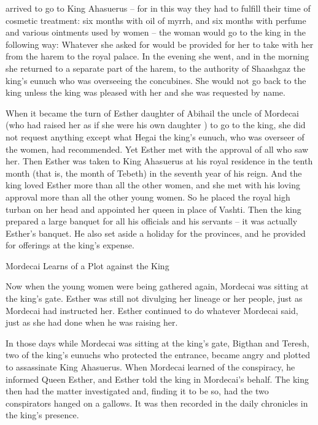 {arrived
to go to
King
Ahasuerus
– for
in this way
they had to fulfill
their time
of cosmetic treatment: six
months
with oil
of myrrh,
and six
months
with perfume
and various ointments
used by women –
the woman
would go
to
the king
in the following way: Whatever
she asked
for would be provided
for her to take
with
her from
the harem
to
the royal
palace.
In the evening
she
went,
and in the morning
she
returned
to
a separate part of the harem,
to the authority of Shaashgaz
the king’s
eunuch
who
was overseeing
the concubines.
She would not
go
back
to
the king
unless
the king
was pleased
with her and she was requested
by name.
\par }{\PP {}When it
became the turn
of Esther
daughter
of Abihail
the uncle
of Mordecai
(who had
raised her
as if
she were his own daughter
) to go
to
the king,
she did not
request
anything
except what
Hegai
the king’s
eunuch,
who was
overseer
of the women,
had recommended. Yet Esther
met
with the approval
of all
who saw her.
Then Esther
was taken
to
King
Ahasuerus
at his royal
residence
in the tenth
month
(that is,
the month
of Tebeth) in the seventh
year
of his reign.
And the king
loved
Esther
more than all
the other women,
and she met
with his loving approval
more than all
the other young women.
So he placed
the royal
high turban
on her head
and appointed her queen
in place
of Vashti.
Then the king
prepared
a large
banquet
for all
his officials
and his servants
– it was actually Esther’s
banquet.
He also set aside
a holiday
for the provinces,
and he provided
for offerings
at the king’s
expense.
\par }{\SH Mordecai Learns of a Plot against the King
\par }{\PP {}Now when the young women
were being gathered
again,
Mordecai
was sitting
at the king’s
gate.
Esther
was still not
divulging
her lineage
or her people,
just as
Mordecai
had instructed
her. Esther
continued to do
whatever Mordecai
said,
just as
she had done when
he was raising her.
\par }{\PP {}In those
days
while
Mordecai
was
sitting
at
the king’s
gate,
Bigthan
and Teresh,
two
of the king’s
eunuchs
who protected
the entrance,
became angry
and plotted to assassinate
King
Ahasuerus.
When Mordecai
learned
of the conspiracy,
he informed
Queen
Esther,
and Esther
told
the king
in Mordecai’s
behalf.
The
king then had
the matter
investigated
and, finding
it to be so, had the two
conspirators hanged
on
a gallows.
It was then recorded
in the daily chronicles
in the king’s
presence.

}
